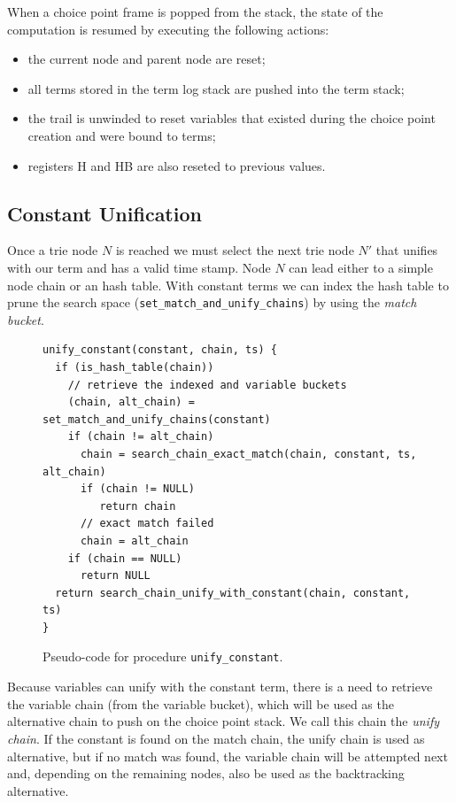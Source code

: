 When a choice point frame is popped from the stack, the state of the computation is resumed
by executing the following actions:

\begin{itemize}
  \item the current node and parent node are reset;
  \item all terms stored in the term log stack are pushed into the term stack;
  \item the trail is unwinded to reset variables that existed during the choice point creation and were bound to terms;
  \item registers H and HB are also reseted to previous values.
\end{itemize}

\subsection{Constant Unification}

Once a trie node $N$ is reached we must select the next trie node $N'$ that unifies with our term and has a valid time stamp. Node $N$ can lead either to a simple node chain or an hash table.
With constant terms we can index the hash table to prune the search space (\texttt{set\_match\_and\_unify\_chains}) by using the \textit{match bucket}.

\begin{figure}[ht]
\begin{Verbatim}
unify_constant(constant, chain, ts) {
  if (is_hash_table(chain))
    // retrieve the indexed and variable buckets
    (chain, alt_chain) = set_match_and_unify_chains(constant)
    if (chain != alt_chain)
      chain = search_chain_exact_match(chain, constant, ts, alt_chain)
      if (chain != NULL)
         return chain
      // exact match failed
      chain = alt_chain
    if (chain == NULL)
      return NULL
  return search_chain_unify_with_constant(chain, constant, ts)
}
\end{Verbatim}
\caption{Pseudo-code for procedure \texttt{unify\_constant}.}
\label{fig:unify_constant}
\end{figure}

Because variables can unify with the constant term, there is a need to retrieve the variable chain
(from the variable bucket), which will be used as the alternative chain to push on the choice point stack.
We call this chain the \textit{unify chain}. If the constant is found on the match chain,
the unify chain is used as alternative, but if no match was found, the variable chain will be attempted
next and, depending on the remaining nodes, also be used as the backtracking alternative.

